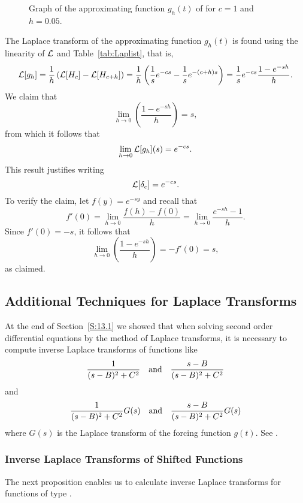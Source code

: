 \begin{figure}[htb]
           \centerline{%
           }
           \caption{Graph of the approximating function $g_h(t)$ of  
	   \protect{} for $c=1$ and $h=0.05$.}
           \label{fig:deltah}
\end{figure}

The Laplace transform of the approximating function $g_h(t)$ is found using 
the linearity of ${\cal L}$ and Table~\ref{tab:Laplist}, that is,
\[
{\cal L}[g_h] =  \frac{1}{h} \left({\cal L}[H_c]-{\cal L}[H_{c+h}]\right) =
\frac{1}{h}\left(\frac{1}{s}e^{-cs}-
\frac{1}{s}e^{-(c+h)s}\right) = \frac{1}{s}e^{-cs}\frac{1-e^{-sh}}{h}.
\]
We claim that
\[
\lim_{h\to 0} \left(\frac{1-e^{-sh}}{h}\right)=s,
\]
from which it follows that 
\[
\lim_{h\to 0} {\cal L}[g_h](s)=e^{-cs}.
\]
This result justifies writing
\begin{equation}  \label{e:lapdel}
{\cal L}[\delta_c] = e^{-cs}.
\end{equation}
To verify the claim, let $f(y)=e^{-sy}$ and recall that 
\[
f'(0) = \lim_{h\to 0} \frac{f(h)-f(0)}{h} =\lim_{h\to 0} \frac{e^{-sh}-1}{h}.
\]
Since $f'(0)=-s$, it follows that
\[
\lim_{h\to 0} \left(\frac{1-e^{-sh}}{h}\right)=-f'(0)=s,
\]
as claimed.


\subsection*{Additional Techniques for Laplace Transforms}

At the end of Section~\ref{S:13.1} we showed that when solving second order
differential equations by the method of Laplace transforms, it is necessary to 
compute inverse Laplace transforms of functions like
\begin{equation}  \label{E:1sttype}
\frac{1}{(s-B)^2+C^2} \quad\mbox{and}\quad \frac{s-B}{(s-B)^2+C^2}
\end{equation}
and 
\begin{equation}  \label{2ndtype}
\frac{1}{(s-B)^2+C^2}G(s) \quad\mbox{and}\quad \frac{s-B}{(s-B)^2+C^2}G(s)
\end{equation}
where $G(s)$ is the Laplace transform of the forcing function $g(t)$.
See .  

\subsubsection*{Inverse Laplace Transforms of Shifted Functions}

The next proposition enables us to calculate inverse Laplace transforms for
functions of type .

